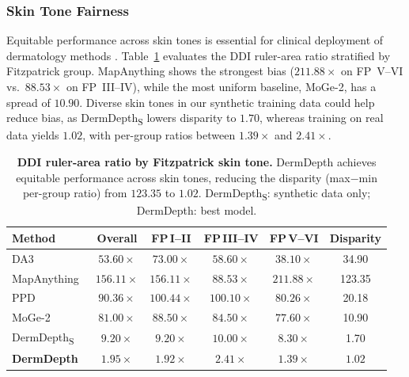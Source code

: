 \documentclass[11pt]{ucthesis}
\newcommand{\DDS}{DermDepth\textsubscript{S}}
\begin{document}
\subsubsection{Skin Tone Fairness}\label{sec:dd_fairness}

Equitable performance across skin tones is essential for clinical deployment of dermatology methods \cite{daneshjou_2022_disparities}. Table~\ref{tab:dd_fairness} evaluates the DDI ruler-area ratio stratified by Fitzpatrick group. MapAnything shows the strongest bias ($211.88\times$ on FP~V--VI vs.\ $88.53\times$ on FP~III--IV), while the most uniform baseline, MoGe-2, has a spread of $10.90$. Diverse skin tones in our synthetic training data could help reduce bias, as \DDS{} lowers disparity to $1.70$, whereas training on real data yields $1.02$, with per-group ratios between $1.39\times$ and $2.41\times$.

\begin{table}[t]
\centering
\caption{\textbf{DDI ruler-area ratio by Fitzpatrick skin tone.} DermDepth achieves equitable performance across skin tones, reducing the disparity (max$-$min per-group ratio) from $123.35$ to $1.02$. \DDS{}: synthetic data only; DermDepth: best model.}
\label{tab:dd_fairness}
\small
\setlength\tabcolsep{4pt}
\begin{tabular}{@{}l cccc c@{}}
\toprule
Method & Overall & FP\,I--II & FP\,III--IV & FP\,V--VI & Disparity \\
\midrule
DA3~\cite{depthanything3}               & $53.60\times$ &  $73.00\times$ &  $58.60\times$ &  $38.10\times$ & 34.90 \\
MapAnything~\cite{keetha2026mapanything} & $156.11\times$ & $156.11\times$ &  $88.53\times$ & $211.88\times$ & 123.35 \\
PPD~\cite{xu2025pixel}                  & $90.36\times$ & $100.44\times$ & $100.10\times$ &  $80.26\times$ & 20.18 \\
MoGe-2~\cite{wang2025moge2}             & $81.00\times$ &  $88.50\times$ &  $84.50\times$ &  $77.60\times$ & 10.90 \\
\midrule
\DDS{}                 &  $9.20\times$ &  $9.20\times$ & $10.00\times$ &  $8.30\times$ &  1.70 \\
\textbf{DermDepth}              & $\mathbf{1.95\times}$ & $\mathbf{1.92\times}$ & $\mathbf{2.41\times}$ & $\mathbf{1.39\times}$ & $\mathbf{1.02}$ \\
\bottomrule
\end{tabular}
\end{table}
\end{document}
